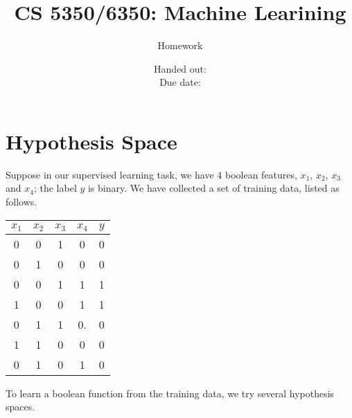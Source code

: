 \documentclass[12pt, fullpage,letterpaper]{article}
\title{CS 5350/6350: Machine Learining \semester}
\author{Homework \assignmentId}
\date{Handed out: \releaseDate\\
  Due date: \dueDate}
\begin{document}
\maketitle





\section{Hypothesis Space}
\label{sec:q1}
 Suppose in our supervised learning task, we have $4$ boolean features, $x_1$, $x_2$, $x_3$ and $x_4$; the label $y$ is binary. We have collected a set of training data, listed as follows. 
\begin{table}[h]
        \centering
        \begin{tabular}{cccc|c}
        $x_1$ & $x_2$ & $x_3$ & $x_4$ & $y$\\ 
        \hline\hline
         0 & 0 & 1 & 0 & 0 \\ \hline
         0 & 1 & 0 & 0 & 0 \\ \hline
         0 & 0 & 1 & 1 & 1 \\ \hline
         1 & 0 & 0 & 1 & 1 \\ \hline
         0 & 1 & 1 & 0.& 0\\ \hline
         1 & 1 & 0 & 0 & 0\\ \hline
         0 & 1 & 0 & 1 & 0\\ \hline
        \end{tabular}
\end{table}
To learn a boolean function from the training data, we try several hypothesis spaces. 
\end{document}
